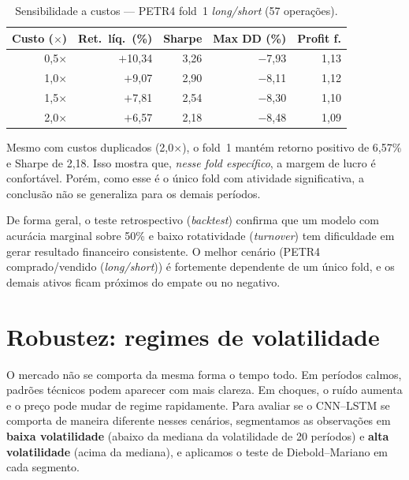\begin{table}[htbp]
  \centering
  \caption{Sensibilidade a custos --- PETR4 fold~1 \textit{long/short} (57 operações).}
  \label{tab:sensibilidade-custos}
  \begin{tabular}{r r r r r}
    \toprule
    \textbf{Custo ($\times$)} & \textbf{Ret.\ líq.\ (\%)} & \textbf{Sharpe} & \textbf{Max DD (\%)} & \textbf{Profit f.} \\
    \midrule
    0,5$\times$ & $+$10,34 & 3,26 & $-$7,93 & 1,13 \\
    1,0$\times$ & $+$9,07  & 2,90 & $-$8,11 & 1,12 \\
    1,5$\times$ & $+$7,81  & 2,54 & $-$8,30 & 1,10 \\
    2,0$\times$ & $+$6,57  & 2,18 & $-$8,48 & 1,09 \\
    \bottomrule
  \end{tabular}
\end{table}

Mesmo com custos duplicados (2,0$\times$), o fold~1 mantém retorno positivo de 6,57\% e
Sharpe de 2,18. Isso mostra que, \emph{nesse fold específico}, a margem de lucro é confortável.
Porém, como esse é o único fold com atividade significativa, a conclusão não se generaliza
para os demais períodos.

De forma geral, o teste retrospectivo (\textit{backtest}) confirma que um modelo com acurácia marginal sobre 50\%
e baixo rotatividade (\textit{turnover}) tem dificuldade em gerar resultado financeiro consistente.
O melhor cenário (PETR4 comprado/vendido (\textit{long/short})) é fortemente dependente de um único fold,
e os demais ativos ficam próximos do empate ou no negativo.

\section{Robustez: regimes de volatilidade}
\label{sec:regimes}

O mercado não se comporta da mesma forma o tempo todo. Em períodos calmos, padrões técnicos
podem aparecer com mais clareza. Em choques, o ruído aumenta e o preço pode mudar de regime
rapidamente. Para avaliar se o CNN--LSTM se comporta de maneira diferente nesses cenários,
segmentamos as observações em \textbf{baixa volatilidade} (abaixo da mediana da volatilidade
de 20 períodos) e \textbf{alta volatilidade} (acima da mediana), e aplicamos o teste de
Diebold--Mariano em cada segmento.

